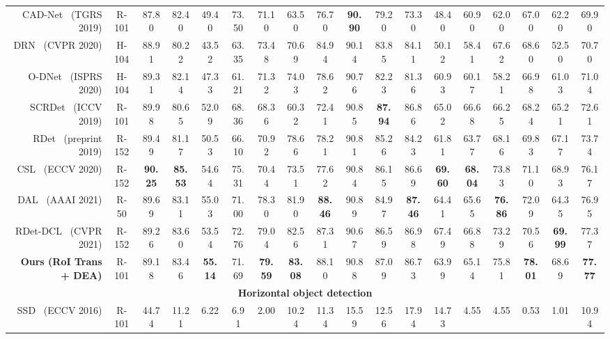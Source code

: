 \documentclass[journal]{IEEEtran}
\begin{document}
\begin{table*}[!htb]
\begin{center}
\begin{threeparttable}
{\begin{tabular}{r|c|ccccccccccccccc|c}
				CAD-Net~\cite{zhang2019cad} (TGRS 2019) & R-101 & 87.80 & 82.40 & 49.40 & 73.50 & 71.10 & 63.50 & 76.70 & \textbf{90.90} & 79.20 & 73.30 & 48.40 & 60.90 & 62.00 & 67.00 & 62.20 & 69.90 \\
				
				DRN~\cite{pan2020dynamic} (CVPR 2020)& H-104 & 88.91	& 80.22 & 43.52 & 63.35 & 73.48 & 70.69 & 84.94 & 90.14 & 83.85 & 84.11 & 50.12 & 58.41 & 67.62 & 68.60 & 52.50 & 70.70 \\
				
				O-DNet~\cite{wei2020oriented} (ISPRS 2020)& H-104 & 89.31	& 82.14 & 47.33 & 61.21 & 71.32 & 74.03 & 78.62 & 90.76 & 82.23 & 81.36 & 60.93 & 60.17 & 58.21 & 66.98 & 61.03 & 71.04 \\
				
				SCRDet~\cite{yang2019scrdet} (ICCV 2019) & R-101 & 89.98	& 80.65 & 52.09 & 68.36 & 68.36 & 60.32 & 72.41 & 90.85 & \textbf{87.94} & 86.86 & 65.02 & 66.68 & 66.25 & 68.24 & 65.21 & 72.61 \\
				
				RDet~\cite{yang2019r3det} (preprint 2019)& R-152 & 89.49	& 81.17 & 50.53 & 66.10 & 70.92 & 78.66 & 78.21 & 90.81 & 85.26 & 84.23 & 61.81 & 63.77 & 68.16 & 69.83 & 67.17 & 73.74 \\
				
				CSL~\cite{yang2020arbitrary} (ECCV 2020) & R-152 & \textbf{90.25}	& \textbf{85.53} & 54.64 & 75.31 & 70.44 & 73.51 & 77.62 & 90.84 & 86.15 & 86.69 & \textbf{69.60} & \textbf{68.04} & 73.83 & 71.10 & 68.93 & 76.17 \\
				
				DAL~\cite{ming2020dynamic} (AAAI 2021)& R-50 & 89.69	& 83.11 & 55.03 & 71.00 & 78.30 & 81.90 & \textbf{88.46} & 90.89 & 84.97 & \textbf{87.46} & 64.41 & 65.65 & \textbf{76.86} & 72.09 & 64.35 & 76.95 \\
				
				RDet-DCL~\cite{yang2020dense} (CVPR 2021)& R-152 & 89.26 & 83.60 & 53.54 & 72.76 & 79.04 & 82.56 & 87.31 & 90.67 & 86.59 & 86.98 & 67.49 & 66.88 & 73.29 & 70.56 & \textbf{69.99} & 77.37\\

				\textbf{Ours (RoI Trans + DEA)} & R-101 & 89.18	& 83.46 & \textbf{55.14} & 71.69 & \textbf{79.59} & \textbf{83.08} & 88.10 & 90.88 & 87.09 & 86.73 &63.99 & 65.14 &75.81 & \textbf{78.01} & 68.69 & \textbf{77.77}\\
				
				\hline
				\multicolumn{18}{c}{\textbf{Horizontal object detection}}\\
				\hline
				SSD~\cite{liu2016ssd} (ECCV 2016)& R-101 & 44.74 	& 11.21 & 6.22 & 6.91 & 2.00 & 10.24 & 11.34 & 15.59 & 12.56 & 17.94 & 14.73 & 4.55 & 4.55 & 0.53 & 1.01 & 10.94 \\
				

\end{tabular}}
\end{threeparttable}
\end{center}
\end{table*}
\end{document}
